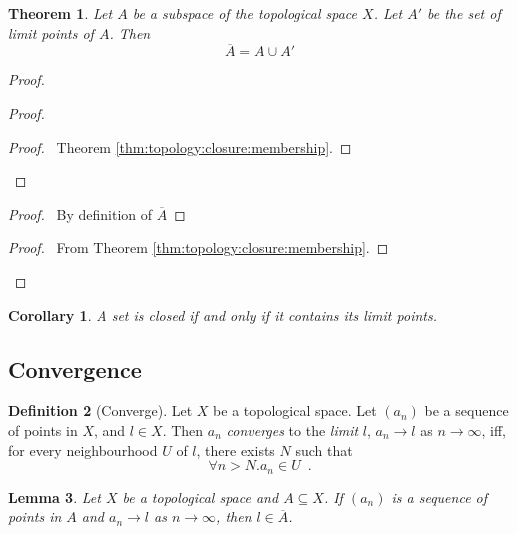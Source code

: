 \documentclass{book}
\newtheorem{lm}{Lemma}[chapter]
\newtheorem{thm}[lm]{Theorem}
\newtheorem{cor}{Corollary}[lm]
\theoremstyle{definition}
\newtheorem{df}[lm]{Definition}
\begin{document}
  \begin{thm}
    Let $A$ be a subspace of the topological space $X$. Let $A'$ be the set of 
    limit points of $A$. Then
    \[ \overline{A} = A \cup A' \]
  \end{thm}
  
  \begin{proof}
    \begin{proof}
      \begin{proof}
        \pf\ Theorem \ref{thm:topology:closure:membership}.
      \end{proof}
    \end{proof}
    \begin{proof}
      \pf\ By definition of $\overline{A}$
    \end{proof}
    \begin{proof}
      \pf\ From Theorem \ref{thm:topology:closure:membership}.
    \end{proof}
  \end{proof}
  
  \begin{cor}
    A set is closed if and only if it contains its limit points.
  \end{cor}
  
  \subsection{Convergence}
  
  \begin{df}[Converge]
    Let $X$ be a topological space. Let $(a_n)$ be a sequence of points in $X$, 
    and $l \in X$. Then $a_n$ \emph{converges} to the \emph{limit} $l$, $a_n 
    \rightarrow l$ as $n \rightarrow \infty$, iff, for every neighbourhood $U$ 
    of 
    $l$, there exists $N$ such that
    \[ \forall n > N. a_n \in U \enspace . \]
  \end{df}
  
  \begin{lm}
    Let $X$ be a topological space and $A \subseteq X$. If $(a_n)$ is a 
    sequence 
    of points in $A$ and $a_n \rightarrow l$ as $n \rightarrow \infty$, then $l 
    \in 
    \overline{A}$.
  \end{lm}
  
\end{document}
